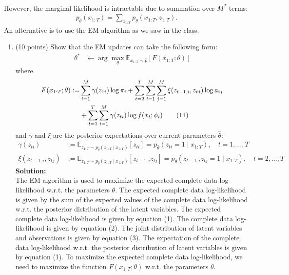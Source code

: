 \documentclass[a3paper,12pt]{extarticle} %
\begin{document}
\begin{enumerate}
\begin{align}
\end{align}
However, the marginal likelihood is intractable due to summation over $M^T$ terms:
\begin{align}
    p_{\theta}(x_{1:T}) = \sum_{z_{1:T}} p_{\theta}(x_{1:T}, z_{1:T}). \tag{9}
\end{align}
An alternative is to use the EM algorithm as we saw in the class.
\begin{enumerate}
    \item (10 points) Show that the EM updates can take the following form:
    \begin{align}
        \theta^* &\leftarrow \arg\max_{\theta} \mathbb{E}_{x_{1:T} \sim \hat{p}} [F(x_{1:T}; \theta)] \tag{10}
    \end{align}
    where
    \begin{align}
        F(x_{1:T}; \theta) := &\sum_{i=1}^{M} \gamma(z_{1i}) \log \pi_i + \sum_{t=2}^{T} \sum_{i=1}^{M} \sum_{j=1}^{M} \xi(z_{t-1,i}, z_{tj}) \log a_{ij} \notag \\
        &+ \sum_{t=1}^{T} \sum_{i=1}^{M} \gamma(z_{ti}) \log f(x_t; \phi_i) \tag{11}
    \end{align}
    and $\gamma$ and $\xi$ are the posterior expectations over current parameters $\hat{\theta}$:
    \begin{align}
        \gamma(z_{ti}) &:= \mathbb{E}_{z_{1:T} \sim p_{\hat{\theta}}(z_{1:T} \mid x_{1:T})} [z_{ti}] = p_{\hat{\theta}}(z_{ti} = 1 \mid x_{1:T}), \quad t = 1, \ldots, T \tag{12} \\
        \xi(z_{t-1,i}, z_{tj}) &:= \mathbb{E}_{z_{1:T} \sim p_{\hat{\theta}}(z_{1:T} \mid x_{1:T})} [z_{t-1,i} z_{tj}] = p_{\hat{\theta}}(z_{t-1,i} z_{tj} = 1 \mid x_{1:T}), \quad t = 2, \ldots, T \tag{13}
    \end{align}
    \textbf{Solution:}
    \\ The EM algorithm is used to maximize the expected complete data log-likelihood w.r.t. the parameters \(\theta\). The expected complete data log-likelihood is given by the sum of the expected values of the complete data log-likelihood w.r.t. the posterior distribution of the latent variables. The expected complete data log-likelihood is given by equation (1). The complete data log-likelihood is given by equation (2). The joint distribution of latent variables and observations is given by equation (3). The expectation of the complete data log-likelihood w.r.t. the posterior distribution of latent variables is given by equation (1). To maximize the expected complete data log-likelihood, we need to maximize the function \(F(x_{1:T}; \theta)\) w.r.t. the parameters \(\theta\).

\end{enumerate}
\end{enumerate}
\end{document}
